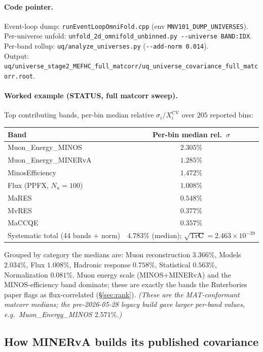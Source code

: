 \documentclass[12pt]{article}
\newcommand{\CV}{\text{CV}}
\newcommand{\Tr}{\mathrm{Tr}}
\begin{document}
\paragraph{Code pointer.}
Event-loop dump:
\texttt{runEventLoopOmniFold.cpp} (env \texttt{MNV101\_DUMP\_UNIVERSES}).\\
Per-universe unfold:
\texttt{unfold\_2d\_omnifold\_unbinned.py -{}-universe BAND:IDX}.\\
Per-band rollup: \texttt{uq/analyze\_universes.py} (\texttt{-{}-add-norm 0.014}).\\
Output:
\texttt{uq/universe\_stage2\_MEFHC\_full\_matcorr/uq\_universe\_covariance\_full\_matcorr.root}.

\paragraph{Worked example (STATUS, full matcorr sweep).}
Top contributing bands, per-bin median relative
$\sigma_{i}/X^{\CV}_{i}$ over $205$ reported bins:
\begin{center}
\begin{tabular}{@{}lc@{}}
\toprule
Band & Per-bin median rel.\ $\sigma$ \\
\midrule
Muon\_Energy\_MINOS & $2.305\%$ \\
Muon\_Energy\_MINERvA & $1.285\%$ \\
MinosEfficiency & $1.472\%$ \\
Flux (PPFX, $N_{u}=100$) & $1.008\%$ \\
MaRES & $0.548\%$ \\
MvRES & $0.377\%$ \\
MaCCQE & $0.357\%$ \\
\midrule
Systematic total (44 bands $+$ norm) & $\boxed{4.783\%}$ (median); $\sqrt{\Tr\mathbf{C}}=2.463\times10^{-39}$ \\
\bottomrule
\end{tabular}
\end{center}
Grouped by category the medians are: Muon reconstruction $3.366\%$,
Models $2.034\%$, Flux $1.008\%$, Hadronic response $0.758\%$,
Statistical $0.563\%$, Normalization $0.081\%$. Muon energy scale
(MINOS$+$MINERvA) and the MINOS-efficiency band dominate; these are
exactly the bands the Ruterbories paper flags as flux-correlated
(\S\ref{sec:rank}). \emph{(These are the MAT-conformant matcorr
medians; the pre-2026-05-28 legacy build gave larger per-band values,
e.g.\ Muon\_Energy\_MINOS $2.571\%$.)}

\subsection{How MINERvA builds its published covariance}
\label{sec:minerva}
\end{document}
